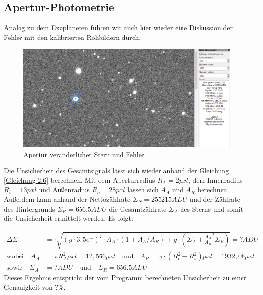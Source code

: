 \documentclass[ngerman,ruledheaders=section,class=report,thesis={type=Protokoll},accentcolor=1b,marginpar=false,parskip=half-,fontsize=11pt,]{tudapub}
\begin{document}
	\subsection{Apertur-Photometrie}
	Analog zu dem Exoplaneten führen wir auch hier wieder eine Diskussion der Fehler mit den kalibrierten Rohbildern durch.
	
	\begin{figure}[h]
		\centering
		\includegraphics[width=0.8\linewidth]{Screenshot 2024-07-01 203800.png}
		\caption{Apertur veränderlicher Stern und Fehler}
		\label{Abbildung 4.42}
	\end{figure}
	
	Die Unsicherheit des Gesamtsignals lässt sich wieder anhand der Gleichung \ref{Gleichung 2.6} berechnen. Mit dem Aperturradius $R_A = 2\si{pxl}$, dem Innenradius $R_i =  13\si{pxl}$ und Außenradius $R_o =  28\si{pxl}$ lassen sich $A_A$ und $A_R$ berechnen. Außerdem kann anhand der Nettozählrate $\Sigma_N =  255215\si{ADU}$ und der Zählrate des Hintergrunds $\Sigma_R = 656.5\si{ADU}$ die Gesamtzählrate $\Sigma_A$ des Sterns und somit die Unsicherheit ermittelt werden. Es folgt:
	
	\begin{equation}
		\begin{aligned}
			\Delta \Sigma &= \cdot \sqrt{(g \cdot 3,5 e^-)^2 \cdot A_A \cdot (1 + A_A /A_R) + g \cdot \left( 
				\Sigma_A + \frac{A_A}{A_R}^2 \Sigma_R
				\right)} = ? \si{ADU} \\
			\text{wobei}
			\quad
			A_A &= \pi R_A ^2 \si{pxl}= 12,566 \si{pxl} 
			\quad 
			\text{und} 
			\quad
			A_R = \pi \cdot (R_o ^2 - R_i^2) \si{pxl} = 1932,08 \si{pxl} \\
			\text{sowie}
			\quad
			\Sigma_A &= ? \si{ADU} 
			\quad
			\text{und}
			\quad
			\Sigma_R = 656.5
			\si{ADU}
		\end{aligned}
	\end{equation}
	Dieses Ergebnis entspricht der vom Programm berechneten Unsicherheit zu einer Genauigkeit von ?\%. 
	
\end{document}
